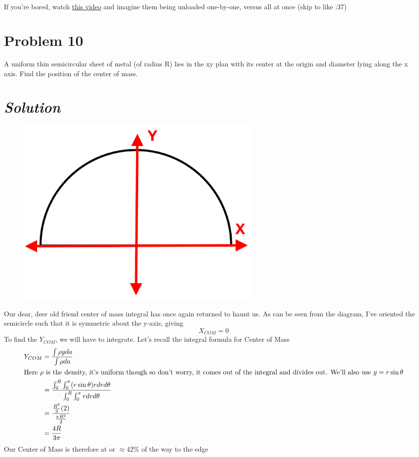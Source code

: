\documentclass{article}
\begin{document}
\begin{enumerate}[label=\alph*)]
\\ 
\\
If you're bored, watch \href{https://www.youtube.com/watch?v=j5b6fpSkqAE}{this video} and imagine them being unloaded one-by-one, versus all at once (skip to like :37)
\end{enumerate}

\section*{Problem 10} 
A uniform thin semicircular sheet of metal (of radius R) lies in the xy plan with its center at the origin and diameter lying along the x axis. Find the position of the center of mass.
\section*{\textit{Solution}} 
\begin{figure}[h]
	\includegraphics[scale=0.35]{P10}
	\centering
\end{figure}
Our dear, deer old friend center of mass integral has once again returned to haunt us. As can be seen from the diagram, I've oriented the semicircle such that it is symmetric about the y-axis, giving
\[ \boxed{ X_{COM} = 0} \]
To find the $Y_{COM}$, we will have to integrate. Let's recall the integral formula for Center of Mass
\begin{align}
	Y_{COM} &= \frac{ \int \rho y da}{\int \rho da} \\ 
	\intertext{Here $\rho$ is the density, it's uniform though so don't worry, it comes out of the integral and divides out. We'll also use $y = r\sin{\theta}$}
	&= \frac{ \int_0^R \int_0^{\pi} (r\sin{\theta}) rdrd\theta }{\int_0^R \int_0^{\pi} rdrd\theta} \\ 
	&= \frac{ \frac{R^3}{3}(2)}{\frac{\pi R^2}{2}} \\
	&= \frac{4R}{3\pi}
\end{align}
Our Center of Mass is therefore at  or $\approx 42\%$ of the way to the edge
\end{document}
